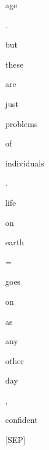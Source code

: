\documentclass[varwidth=150mm]{standalone}
\begin{document}
\begin{CJK*}{UTF8}{gbsn}
{{{\colorbox{red!0.0}{\strut age} \colorbox{red!0.0}{\strut .} \colorbox{red!11.706786155700684}{\strut but} \colorbox{red!0.0}{\strut these} \colorbox{red!0.0}{\strut are} \colorbox{red!3.084493398666382}{\strut just} \colorbox{red!0.0}{\strut problems} \colorbox{red!5.875114917755127}{\strut of} \colorbox{red!0.0}{\strut individuals} \colorbox{red!0.0}{\strut .} \colorbox{red!0.0}{\strut life} \colorbox{red!9.15783977508545}{\strut on} \colorbox{red!35.960655212402344}{\strut earth} \colorbox{red!40.06199264526367}{\strut =} \colorbox{red!0.0}{\strut goes} \colorbox{red!0.0}{\strut on} \colorbox{red!11.233840942382812}{\strut as} \colorbox{red!0.0}{\strut any} \colorbox{red!0.0}{\strut other} \colorbox{red!0.0}{\strut day} \colorbox{red!41.802066802978516}{\strut ,} \colorbox{red!2.4994630813598633}{\strut confident} \colorbox{red!2.694869041442871}{\strut [SEP]}
}}}
\end{CJK*}
\end{document}
